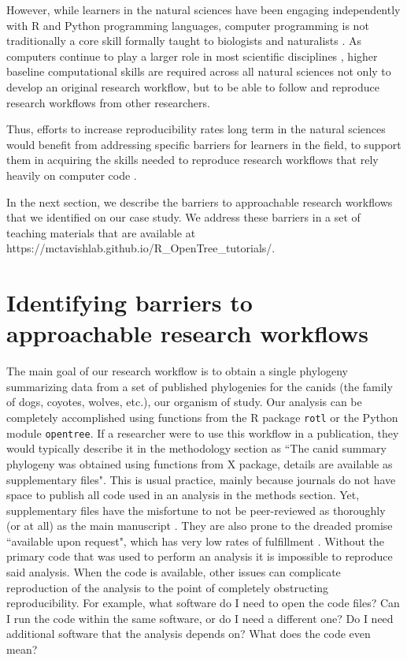 \documentclass[12pt]{article}
\begin{document}
However, while learners in the natural sciences have been engaging independently
with R and Python programming languages, computer programming is not traditionally
a core skill formally taught to biologists and naturalists
\citep{sayres2018bioinformatics, wright2019the, williams2019barriers}.
As computers continue to play a larger role in most scientific disciplines \citep{piccolo2016tools},
higher baseline computational skills are required across all natural sciences not only
to develop an original research workflow, but to be able to follow and reproduce
research workflows from other researchers.

Thus, efforts to increase reproducibility rates long term in the natural sciences
would benefit from addressing specific barriers for learners in the field, to
support them in acquiring the skills needed to reproduce research workflows
that rely heavily on computer code \citep{peng2011reproducible, sandve2013ten, powers2019open}.

In the next section, we describe the barriers to approachable research workflows that we identified
on our case study. We address these barriers in a set of teaching materials that are
available at
https://mctavishlab.github.io/R\_OpenTree\_tutorials/.


\section*{Identifying barriers to approachable research workflows}
\label{sec:identifying}


The main goal of our research workflow is to obtain a single phylogeny summarizing
data from a set of published phylogenies for the canids (the family of dogs, coyotes, wolves, etc.),
our organism of study.
Our analysis can be completely accomplished using functions
from the R package \texttt{rotl} or the Python module \texttt{opentree}. If
a researcher were to use this workflow in a publication, they would typically
describe it in the methodology section as ``The canid summary phylogeny was obtained using
functions from X package, details are available as supplementary files".
This is usual practice, mainly because journals do not have space to publish
all code used in an analysis in the methods section. Yet, supplementary files have
the misfortune to not be peer-reviewed as thoroughly (or at all) as the main manuscript
\citep{CITATION}.
They are also prone to the dreaded promise ``available upon request", which has
very low rates of fulfillment \citep{CITATION}.
Without the primary code that was used to perform an analysis it is impossible
to reproduce said analysis. When the code is available, other issues can
complicate reproduction of the analysis to the point of completely obstructing
reproducibility.
For example, what software do I need to open the code files? Can I run the code within the same
software, or do I need a different one?
Do I need additional software that the analysis depends on? What does the code even mean?
\end{document}
